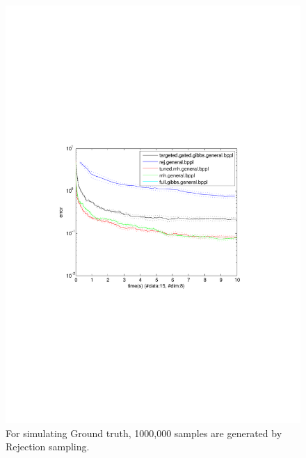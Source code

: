 \begin{figure}%
\centering
\includegraphics[width=1.2\textwidth]{pic1/errVtimeData15Dim8.pdf}
\caption{\footnotesize For simulating Ground truth, 1000,000 samples are generated by Rejection sampling. }
\label{fig:pref}
\end{figure}

